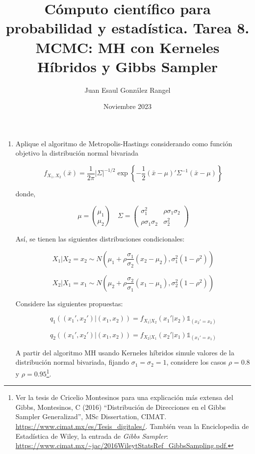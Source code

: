 \documentclass{article}
\title{Cómputo científico para probabilidad y estadística. Tarea 8.\\
MCMC: MH con Kerneles Híbridos y Gibbs
Sampler}
\author{Juan Esaul González Rangel}
\date{Noviembre 2023}
\begin{document}
\maketitle


\begin{enumerate}

    \item Aplique el algoritmo de Metropolis-Hastings considerando como función 
    objetivo la distribución normal bivariada

    \[ f_{X_1,X_2}(\bar x) = \frac1{2\pi} |\Sigma|^{-1/2} \exp\left\{ -\frac12 
    (\bar x - \mu)'\Sigma^{-1}(\bar x - \mu) \right\} \]

    donde, 

    \[ \mu = \binom{\mu_1}{\mu_2} \quad \Sigma = \begin{pmatrix}
        \sigma_1^2 & \rho \sigma_1\sigma_2 \\
        \rho\sigma_1\sigma_2 & \sigma_2^2
    \end{pmatrix} \]
    
    Así, se tienen las siguientes distribuciones condicionales:
    
    \[ X_1 | X_2 = x_2 \sim N\left( \mu_1 + \rho \frac{\sigma_1}{\sigma_2}(x_2 - 
    \mu_2), \sigma_1^2(1 - \rho^2) \right) \]

    \[ X_2 | X_1 = x_1 \sim N\left( \mu_2 + \rho \frac{\sigma_2}{\sigma_1}(x_1 - 
    \mu_1), \sigma_2^2(1-\rho^2) \right) \]
    
    Considere las siguientes propuestas:

    \[ q_1 ((x_1',x_2') | (x_1,x_2)) = f_{X_1|X_2}(x_1'|x_2)\mathds 1_{(x_2' = x_2)}  \]

    \[ q_2 ((x_1',x_2') | (x_1,x_2)) = f_{X_2|X_1}(x_2'|x_1)\mathds 1_{(x_1' = x_1)}  \]

    
    A partir del algoritmo MH usando Kerneles híbridos simule valores de la distribución 
    normal bivariada, fijando $\sigma_1 = \sigma_2 = 1$, considere los casos 
    $\rho = 0.8$ y $\rho = 0.95$\footnote{Ver la tesis de Cricelio Montesinos para 
    una explicación más extensa del Gibbs, Montesinos, C (2016) ``Distribución de 
    Direcciones en el Gibbs Sampler Generalizad'', MSc Dissertation, CIMAT. 
    \url{https://www.cimat.mx/es/Tesis_digitales/}. También vean la Enciclopedia 
    de Estadística de Wiley, la entrada de \textit{Gibbs Sampler}: 
    \url{https://www.cimat.mx/~jac/2016WileytStatsRef_GibbsSampling.pdf.}}.




\end{enumerate}
\end{document}
